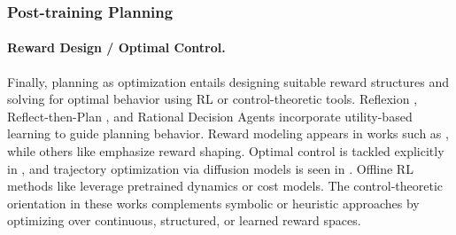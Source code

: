\subsubsection{Post-training Planning}


\paragraph{Reward Design / Optimal Control.} Finally, planning as optimization entails designing suitable reward structures and solving for optimal behavior using RL or control-theoretic tools. Reflexion \cite{shinn2023reflexion}, Reflect-then-Plan \cite{jeong2025reflect}, and Rational Decision Agents \cite{ye2023rational} incorporate utility-based learning to guide planning behavior. Reward modeling appears in works such as \cite{chen2025scaling}, while others like \cite{luyten2025strategic} emphasize reward shaping. Optimal control is tackled explicitly in \cite{ma2024non,ni2025physics,matada2024generalizable, su2025toolorchestra}, and trajectory optimization via diffusion models is seen in \cite{xie2025latent,xiao2023safediffuser,shan2025contradiff}. Offline RL methods like \cite{kong2024latent,ruoss2024amortized,wang2023goplan} leverage pretrained dynamics or cost models. The control-theoretic orientation in these works complements symbolic or heuristic approaches by optimizing over continuous, structured, or learned reward spaces.

